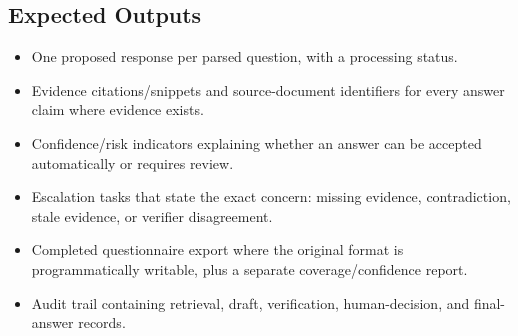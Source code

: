 \documentclass[11pt,journal,onecolumn]{IEEEtran}
\begin{document}
\subsection{Expected Outputs}
\begin{itemize}[leftmargin=1.7em]
    \item One proposed response per parsed question, with a processing status.
    \item Evidence citations/snippets and source-document identifiers for every answer claim where evidence exists.
    \item Confidence/risk indicators explaining whether an answer can be accepted automatically or requires review.
    \item Escalation tasks that state the exact concern: missing evidence, contradiction, stale evidence, or verifier disagreement.
    \item Completed questionnaire export where the original format is programmatically writable, plus a separate coverage/confidence report.
    \item Audit trail containing retrieval, draft, verification, human-decision, and final-answer records.
\end{itemize}
\end{document}

